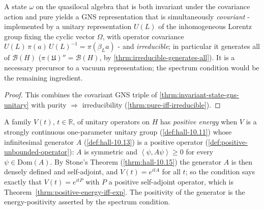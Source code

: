 \begin{theorem}
    \label{thrm:irreducible-covariant-representation}
    \leanok
    A state $\omega$ on the quasilocal algebra that is both invariant under the covariance action and pure yields a GNS representation that is simultaneously \emph{covariant} - implemented by a unitary representation $U(L)$ of the inhomogeneous Lorentz group fixing the cyclic vector $\Omega$, with operator covariance $U(L)\,\pi(a)\,U(L)^{-1} = \pi(\beta_L a)$ - and \emph{irreducible}; in particular it generates all of $\mathcal{B}(H)$ ($\pi(\mathfrak{U})'' = \mathcal{B}(H)$, by \ref{thrm:irreducible-generates-all}). It is a necessary precursor to a vacuum representation; the spectrum condition would be the remaining ingredient.
\end{theorem}
\begin{proof}
    \leanok
    This combines the covariant GNS triple of \ref{thrm:invariant-state-gns-unitary} with purity $\Rightarrow$ irreducibility (\ref{thrm:pure-iff-irreducible}).
\end{proof}

\begin{definition}
    \label{def:positive-energy}
    \leanok
    A family $V(t)$, $t \in \mathbb{R}$, of unitary operators on $H$ has \emph{positive energy} when $V$ is a strongly continuous one-parameter unitary group (\ref{def:hall-10.11}) whose infinitesimal generator $A$ (\ref{def:hall-10.13}) is a positive operator (\ref{def:positive-unbounded-operator}): $A$ is symmetric and $\left< \psi, A\psi \right> \ge 0$ for every $\psi \in \text{Dom}(A)$. By Stone's Theorem (\ref{thrm:hall-10.15}) the generator $A$ is then densely defined and self-adjoint, and $V(t) = e^{itA}$ for all $t$; so the condition says exactly that $V(t) = e^{itP}$ with $P$ a positive self-adjoint operator, which is Theorem~\ref{thrm:positive-energy-iff-exp}. The positivity of the generator is the energy-positivity asserted by the spectrum condition.
\end{definition}

